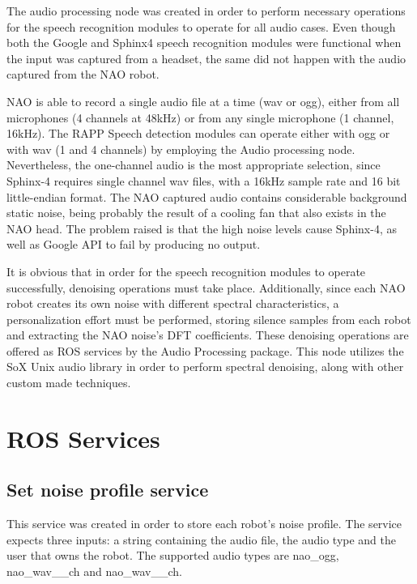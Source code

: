 The audio processing node was created in order to perform necessary operations for the speech recognition modules to operate for all audio cases. Even though both the Google and Sphinx4 speech recognition modules were functional when the input was captured from a headset, the same did not happen with the audio captured from the N\-A\-O robot.

N\-A\-O is able to record a single audio file at a time (wav or ogg), either from all microphones (4 channels at 48k\-Hz) or from any single microphone (1 channel, 16k\-Hz). The R\-A\-P\-P Speech detection modules can operate either with ogg or with wav (1 and 4 channels) by employing the Audio processing node. Nevertheless, the one-\/channel audio is the most appropriate selection, since Sphinx-\/4 requires single channel wav files, with a 16k\-Hz sample rate and 16 bit little-\/endian format. The N\-A\-O captured audio contains considerable background static noise, being probably the result of a cooling fan that also exists in the N\-A\-O head. The problem raised is that the high noise levels cause Sphinx-\/4, as well as Google A\-P\-I to fail by producing no output.

It is obvious that in order for the speech recognition modules to operate successfully, denoising operations must take place. Additionally, since each N\-A\-O robot creates its own noise with different spectral characteristics, a personalization effort must be performed, storing silence samples from each robot and extracting the N\-A\-O noise’s D\-F\-T coefficients. These denoising operations are offered as R\-O\-S services by the Audio Processing package. This node utilizes the So\-X Unix audio library in order to perform spectral denoising, along with other custom made techniques.

\section*{R\-O\-S Services}

\subsection*{Set noise profile service}

This service was created in order to store each robot’s noise profile. The service expects three inputs\-: a string containing the audio file, the audio type and the user that owns the robot. The supported audio types are nao\-\_\-ogg, nao\-\_\-wav\-\_\-\_\-ch and nao\-\_\-wav\-\_\-\_\-ch.

